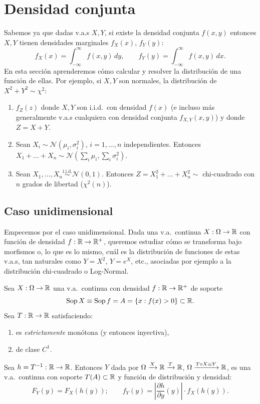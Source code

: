 \section{Densidad conjunta}
Sabemos ya que dadas v.a.s $X, Y$, si existe la densidad conjunta $f(x,y)$ entonces $X, Y$ tienen densidades marginales $f_X(x)$, $f_Y(y)$:
\begin{equation*}
  f_X(x) = \int_{-\infty}^\infty f(x,y)\,dy, \qquad f_Y(y) = \int_{-\infty}^\infty f(x,y)\,dx.
\end{equation*}
En esta sección aprenderemos cómo calcular y resolver la distribución de una función de ellas. Por ejemplo, si $X, Y$ son normales, la distribución de $X^2 + Y^2 \sim \chi^2$:
\begin{enumerate}
  \item $f_Z(z)$ donde $X, Y$ son i.i.d.\ con densidad $f(x)$ (e incluso más generalmente v.a.s cualquiera con densidad conjunta $f_{X,Y}(x,y)$) y donde $Z = X + Y$.
  \item Sean $X_i \sim \mathcal{N}(\mu_i, \sigma_i^2)$, $i=1,\dots,n$ independientes. Entonces $X_1 + \dots + X_n \sim \mathcal{N}\!\left(\sum_i \mu_i, \sum_i \sigma_i^2\right)$.
  \item Sean $X_1, \dots, X_n \stackrel{\text{i.i.d.}}{\sim} \mathcal{N}(0,1)$. Entonces $Z = X_1^2 + \dots + X_n^2 \sim$ chi-cuadrado con $n$ grados de libertad ($\chi^2(n)$).
\end{enumerate}

\subsection{Caso unidimensional}

Empecemos por el caso unidimensional. Dada una v.a.\ continua $X : \Omega \to \mathbb{R}$ con función de densidad $f : \mathbb{R} \to \mathbb{R}^+$, queremos estudiar cómo se transforma bajo morfismos o, lo que es lo mismo, cuál es la distribución de funciones de estas v.a.s, tan naturales como $Y = X^2$, $Y = e^X$, etc., asociadas por ejemplo a la distribución chi-cuadrado o Log-Normal.

\begin{proposicion}[23]
Sea $X : \Omega \to \mathbb{R}$ una v.a.\ continua con densidad $f : \mathbb{R} \to \mathbb{R}^+$ de soporte
\[
  \operatorname{Sop} X \equiv \operatorname{Sop} f = A = \{x : f(x) > 0\} \subset \mathbb{R}.
\]
Sea $T : \mathbb{R} \to \mathbb{R}$ satisfaciendo:
\begin{enumerate}
  \item es \emph{estrictamente} monótona (y entonces inyectiva),
  \item de clase $C^1$.
\end{enumerate}
Sea $h = T^{-1} : \mathbb{R} \to \mathbb{R}$. Entonces $Y$ dada por $\Omega \xrightarrow{X} \mathbb{R} \xrightarrow{T} \mathbb{R}$, $\Omega \xrightarrow{T \circ X \equiv Y} \mathbb{R}$, es una v.a.\ continua con soporte $T(A) \subset \mathbb{R}$ y función de distribución y densidad:
\begin{equation*}
  F_Y(y) = F_X(h(y)); \qquad f_Y(y) = \left|\frac{\partial h}{\partial y}(y)\right| \cdot f_X(h(y)).
\end{equation*}
\end{proposicion}

